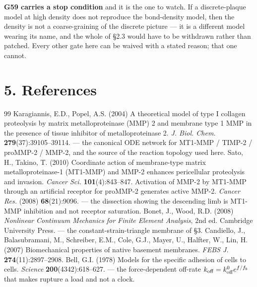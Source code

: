 \documentclass[10pt,a4paper]{article}
\begin{document}
\textbf{G59 carries a stop condition} and it is the one to watch. If a discrete-plaque model at high
density does not reproduce the bond-density model, then the density is not a coarse-graining of the
discrete picture --- it is a different model wearing its name, and the whole of \S2.3 would have to be
withdrawn rather than patched. Every other gate here can be waived with a stated reason; that one
cannot.


\section*{5.\; References}


{\small
\begin{thebibliography}{99}\setlength{\itemsep}{0pt}
 Karagiannis, E.D., Popel, A.S. (2004) A theoretical model of type I
collagen proteolysis by matrix metalloproteinase (MMP) 2 and membrane type 1 MMP in the presence of
tissue inhibitor of metalloproteinase 2. \emph{J. Biol. Chem.} \textbf{279}(37):39105--39114. --- the
canonical ODE network for MT1-MMP / TIMP-2 / proMMP-2 / MMP-2, and the source of the reaction topology
used here.
 Sato, H., Takino, T. (2010) Coordinate action of membrane-type matrix
metalloproteinase-1 (MT1-MMP) and MMP-2 enhances pericellular proteolysis and invasion.
\emph{Cancer Sci.} \textbf{101}(4):843--847.
 Activation of MMP-2 by MT1-MMP through an artificial receptor for proMMP-2
generates active MMP-2. \emph{Cancer Res.} (2008) \textbf{68}(21):9096. --- the dissection showing the
descending limb is MT1-MMP inhibition and not receptor saturation.
 Bonet, J., Wood, R.D. (2008) \emph{Nonlinear Continuum Mechanics for Finite Element
Analysis}, 2nd ed. Cambridge University Press. --- the constant-strain-triangle membrane of \S3.
 Candiello, J., Balasubramani, M., Schreiber, E.M., Cole, G.J., Mayer, U.,
Halfter, W., Lin, H. (2007) Biomechanical properties of native basement membranes.
\emph{FEBS J.} \textbf{274}(11):2897--2908.
 Bell, G.I. (1978) Models for the specific adhesion of cells to cells.
\emph{Science} \textbf{200}(4342):618--627. --- the force-dependent off-rate
$k_{\rm off}=k^0_{\rm off}e^{f/f_b}$ that makes rupture a load and not a clock.


\end{thebibliography}}
\end{document}
